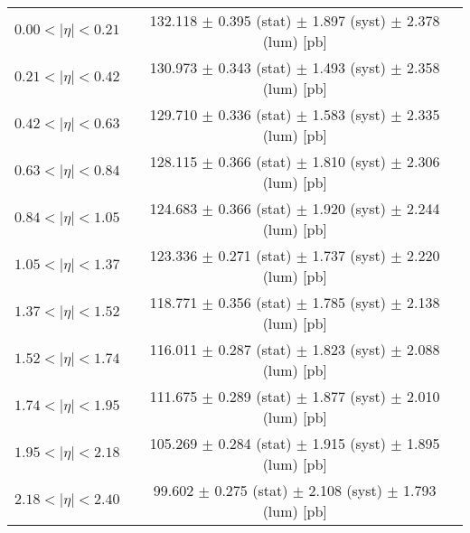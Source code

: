 \begin{tabular}{lc}
\hline
$0.00 < |\eta| <0.21$          & 132.118 $\pm$ 0.395 (stat) $\pm$ 1.897 (syst) $\pm$ 2.378 (lum) [pb]  \\
$0.21 < |\eta| <0.42$          & 130.973 $\pm$ 0.343 (stat) $\pm$ 1.493 (syst) $\pm$ 2.358 (lum) [pb]  \\
$0.42 < |\eta| <0.63$          & 129.710 $\pm$ 0.336 (stat) $\pm$ 1.583 (syst) $\pm$ 2.335 (lum) [pb]  \\
$0.63 < |\eta| <0.84$          & 128.115 $\pm$ 0.366 (stat) $\pm$ 1.810 (syst) $\pm$ 2.306 (lum) [pb]  \\
$0.84 < |\eta| <1.05$          & 124.683 $\pm$ 0.366 (stat) $\pm$ 1.920 (syst) $\pm$ 2.244 (lum) [pb]  \\
$1.05 < |\eta| <1.37$          & 123.336 $\pm$ 0.271 (stat) $\pm$ 1.737 (syst) $\pm$ 2.220 (lum) [pb]  \\
$1.37 < |\eta| <1.52$          & 118.771 $\pm$ 0.356 (stat) $\pm$ 1.785 (syst) $\pm$ 2.138 (lum) [pb]  \\
$1.52 < |\eta| <1.74$          & 116.011 $\pm$ 0.287 (stat) $\pm$ 1.823 (syst) $\pm$ 2.088 (lum) [pb]  \\
$1.74 < |\eta| <1.95$          & 111.675 $\pm$ 0.289 (stat) $\pm$ 1.877 (syst) $\pm$ 2.010 (lum) [pb]  \\
$1.95 < |\eta| <2.18$          & 105.269 $\pm$ 0.284 (stat) $\pm$ 1.915 (syst) $\pm$ 1.895 (lum) [pb]  \\
$2.18 < |\eta| <2.40$          & 99.602 $\pm$ 0.275 (stat) $\pm$ 2.108 (syst) $\pm$ 1.793 (lum) [pb]  \\
\hline
\end{tabular}
